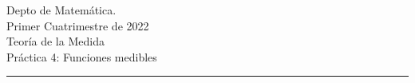 \documentclass{book}
\newcommand{\rr}{\mathbb{R}}
\begin{document}


\begin{large}
\begin{bfseries} %
        \noindent Depto de Matem\'atica.\\
        Primer Cuatrimestre de 2022\\                                                                                                                                                                                                                                                                                                                                                
        Teoría de la Medida \\
        Práctica 4: Funciones medibles

\end{bfseries}
\end{large}
\par\noindent\rule{\textwidth}{.5pt}

\end{document}
